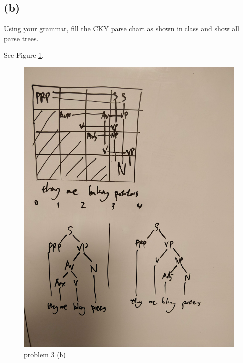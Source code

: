 \documentclass[twoside,11pt]{homework}
\begin{document}
\subsection*{(b)}
\begin{prob}
  Using your grammar, fill the CKY parse chart as shown in class and show all
  parse trees.
\end{prob}

\begin{solution}
  See Figure \ref{fig:03}.
  \begin{figure}
  	\centering
  	\includegraphics[width=0.7\linewidth]{../03-2}
  	\caption{problem 3 (b)}
  	\label{fig:03}
  \end{figure}
  
\end{solution}
\end{document}
